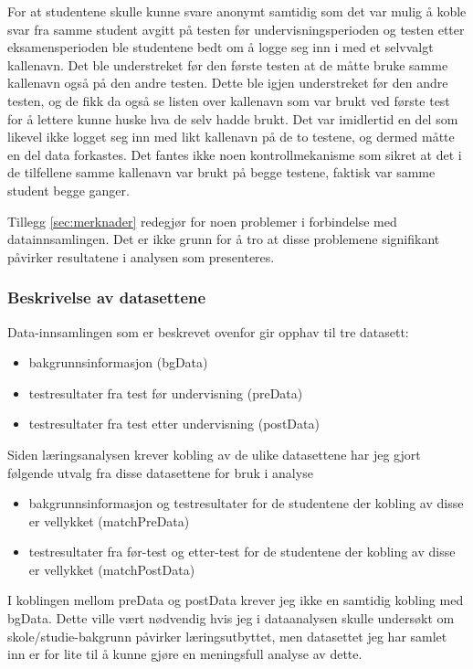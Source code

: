 \documentclass[a4paper,norsk,12pt]{article}
\begin{document}
For at studentene skulle kunne svare anonymt samtidig som det var mulig å koble svar fra samme student avgitt på testen før undervisningsperioden og testen etter eksamensperioden ble studentene bedt om å logge seg inn i med et selvvalgt kallenavn. Det ble understreket før den første testen at de måtte bruke samme kallenavn også på den andre testen. Dette ble igjen understreket før den andre testen, og de fikk da også se listen over kallenavn som var brukt ved første test for å lettere kunne huske hva de selv hadde brukt. Det var imidlertid en del som likevel ikke logget seg inn med likt kallenavn på de to testene, og dermed måtte en del data forkastes. Det fantes ikke noen kontrollmekanisme som sikret at det i de tilfellene samme kallenavn var brukt på begge testene, faktisk var samme student begge ganger.

Tillegg \ref{sec:merknader} redegjør for noen problemer i forbindelse med datainnsamlingen. Det er ikke grunn for å tro at disse problemene signifikant påvirker resultatene i analysen som presenteres.

\subsubsection{Beskrivelse av datasettene}
Data-innsamlingen som er beskrevet ovenfor gir opphav til tre datasett:
\begin{itemize}
\item
	bakgrunnsinformasjon (bgData)
\item
	testresultater fra test før undervisning (preData)
\item
	testresultater fra test etter undervisning (postData)
\end{itemize}
Siden læringsanalysen krever kobling av de ulike datasettene har jeg gjort følgende utvalg fra disse datasettene for bruk i analyse
\begin{itemize}
\item
	bakgrunnsinformasjon og testresultater for de studentene der kobling av disse er vellykket (matchPreData)
\item
	testresultater fra før-test og etter-test for de studentene der kobling av disse er vellykket (matchPostData)
\end{itemize}
I koblingen mellom preData og postData krever jeg ikke en samtidig kobling med bgData. Dette ville vært nødvendig hvis jeg i dataanalysen skulle undersøkt om skole/studie-bakgrunn påvirker læringsutbyttet, men datasettet jeg har samlet inn er for lite til å kunne gjøre en meningsfull analyse av dette.
\end{document}
